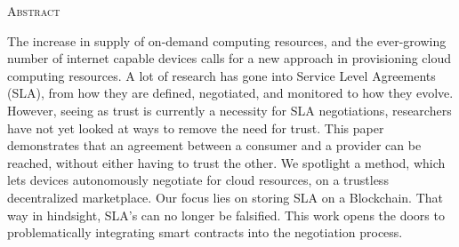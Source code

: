 \begin{center}
  \textsc{Abstract}
\end{center}
%
\noindent
%


The increase in supply of on-demand computing resources, and the ever-growing number of internet capable devices calls for a new approach in provisioning cloud computing resources. A lot of research has gone into Service Level Agreements (SLA), from how they are defined, negotiated, and monitored to how they evolve. However, seeing as trust is currently a necessity for SLA negotiations, researchers have not yet looked at ways to remove the need for trust. This paper demonstrates that an agreement between a consumer and a provider can be reached, without either having to trust the other. We spotlight a method, which lets devices autonomously negotiate for cloud resources, on a trustless decentralized marketplace. Our focus lies on storing SLA on a Blockchain. That way in hindsight, SLA's can no longer be falsified. This work opens the doors to problematically integrating smart contracts into the negotiation process.



